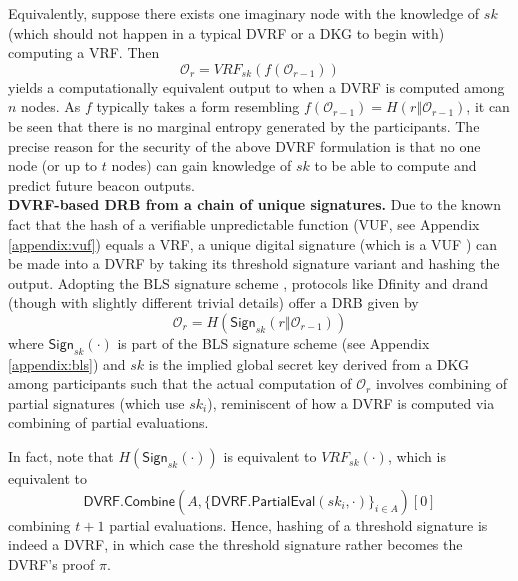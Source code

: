 \documentclass[letterpaper,twocolumn,10pt]{article}
\theoremstyle{definition}
\theoremstyle{remark}
\begin{document}
Equivalently, suppose there exists one imaginary node with the knowledge of $sk$ (which should not happen in a typical DVRF or a DKG to begin with) computing a VRF. Then
\[
\mathcal{O}_r = VRF_{sk}(f(\mathcal{O}_{r - 1}))
\]
yields a computationally equivalent output to when a DVRF is computed among $n$ nodes. As $f$ typically takes a form resembling $f(\mathcal{O}_{r - 1}) = H(r \mathbin\Vert \mathcal{O}_{r - 1})$, it can be seen that there is no marginal entropy generated by the participants. The precise reason for the security of the above DVRF formulation is that no one node (or up to $t$ nodes) can gain knowledge of $sk$ to be able to compute and predict future beacon outputs.\\

\noindent\textbf{DVRF-based DRB from a chain of unique signatures.}
Due to the known fact that the hash of a verifiable unpredictable function (VUF, see Appendix \ref{appendix:vuf}) equals a VRF, a unique digital signature (which is a VUF \cite{dodis2005verifiable}) can be made into a DVRF by taking its threshold signature variant and hashing the output. Adopting the BLS signature scheme \cite{boneh2001short}, protocols like Dfinity \cite{hanke2018dfinity} and drand \cite{drand} (though with slightly different trivial details) offer a DRB given by
\[
\mathcal{O}_r = H(\mathsf{Sign}_{sk}(r \mathbin\Vert \mathcal{O}_{r - 1}))
\]
where $\mathsf{Sign}_{sk}(\cdot)$ is part of the BLS signature scheme (see Appendix \ref{appendix:bls}) and $sk$ is the implied global secret key derived from a DKG among participants such that the actual computation of $\mathcal{O}_r$ involves combining of partial signatures (which use $sk_i$), reminiscent of how a DVRF is computed via combining of partial evaluations.

In fact, note that $H(\mathsf{Sign}_{sk}(\cdot))$ is equivalent to $VRF_{sk}(\cdot)$, which is equivalent to
\[
\mathsf{DVRF.Combine}(A, \{\mathsf{DVRF.PartialEval}(sk_i, \cdot)\}_{i \in A})[0]
\]
combining $t + 1$ partial evaluations. Hence, hashing of a threshold signature is indeed a DVRF, in which case the threshold signature rather becomes the DVRF's proof $\pi$.\\
\end{document}
